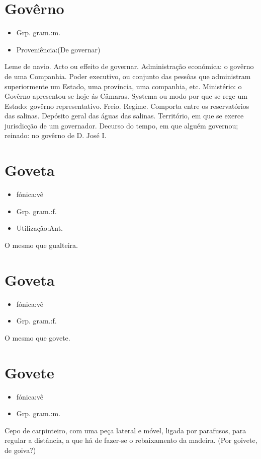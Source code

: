\section{Govêrno}
\begin{itemize}
\item {Grp. gram.:m.}
\end{itemize}
\begin{itemize}
\item {Proveniência:(De \textunderscore governar\textunderscore )}
\end{itemize}
Leme de navio.
Acto ou effeito de governar.
Administração económica: \textunderscore o govêrno de uma Companhia\textunderscore .
Poder executivo, ou conjunto das pessôas que administram superiormente um Estado, uma província, uma companhia, etc.
Ministério: \textunderscore o Govêrno apresentou-se hoje ás Câmaras\textunderscore .
Systema ou modo por que se rege um Estado: \textunderscore govêrno representativo\textunderscore .
Freio.
Regime.
Comporta entre os reservatórios das salinas.
Depósito geral das águas das salinas.
Território, em que se exerce jurisdicção de um governador.
Decurso do tempo, em que alguém governou; reinado: \textunderscore no govêrno de D. José I\textunderscore .
\section{Goveta}
\begin{itemize}
\item {fónica:vê}
\end{itemize}
\begin{itemize}
\item {Grp. gram.:f.}
\end{itemize}
\begin{itemize}
\item {Utilização:Ant.}
\end{itemize}
O mesmo que \textunderscore gualteira\textunderscore .
\section{Goveta}
\begin{itemize}
\item {fónica:vê}
\end{itemize}
\begin{itemize}
\item {Grp. gram.:f.}
\end{itemize}
O mesmo que \textunderscore govete\textunderscore .
\section{Govete}
\begin{itemize}
\item {fónica:vê}
\end{itemize}
\begin{itemize}
\item {Grp. gram.:m.}
\end{itemize}
Cepo de carpinteiro, com uma peça lateral e móvel, ligada por parafusos, para regular a distância, a que há de fazer-se o rebaixamento da madeira.
(Por \textunderscore goivete\textunderscore , de \textunderscore goiva\textunderscore ?)
